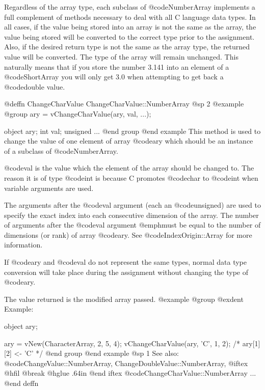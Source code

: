 Regardless of the array type, each subclass of @code{NumberArray}
implements a full complement of methods necessary to deal with all C
language data types.  In all cases, if the value being stored into an
array is not the same as the array, the value being stored will be
converted to the correct type prior to the assignment.  Also, if the
desired return type is not the same as the array type, the returned
value will be converted.  The type of the array will remain unchanged.
This naturally means that if you store the number 3.141 into an element
of a @code{ShortArray} you will only get 3.0 when attempting to get
back a @code{double} value.










@deffn {ChangeCharValue} ChangeCharValue::NumberArray
@sp 2
@example
@group
ary = vChangeCharValue(ary, val, ...);

object    ary;
int       val;
unsigned  ...
@end group
@end example
This method is used to change the value of one element of
array @code{ary} which should be an instance of a subclass of
@code{NumberArray}.

@code{val} is the value which the element of the array should be changed
to.  The reason it is of type @code{int} is because C promotes @code{char}
to @code{int} when variable arguments are used.

The arguments after the @code{val} argument (each an @code{unsigned})
are used to specify the exact index into each consecutive dimension of
the array.  The number of arguments after the @code{val} argument
@emph{must} be equal to the number of dimensions (or rank) of array
@code{ary}.  See @code{IndexOrigin::Array} for more information.

If @code{ary} and @code{val} do not represent the same types, normal
data type conversion will take place during the assignment without
changing the type of @code{ary}.

The value returned is the modified array passed.
@example
@group
@exdent Example:

object  ary;

ary = vNew(CharacterArray, 2, 5, 4);
vChangeCharValue(ary, 'C', 1, 2);
/*  ary[1][2] <- 'C'  */
@end group
@end example
@sp 1
See also:  @code{ChangeValue::NumberArray, ChangeDoubleValue::NumberArray,}
@iftex
@hfil @break @hglue .64in 
@end iftex
@code{ChangeCharValue::NumberArray}  ...
@end deffn







